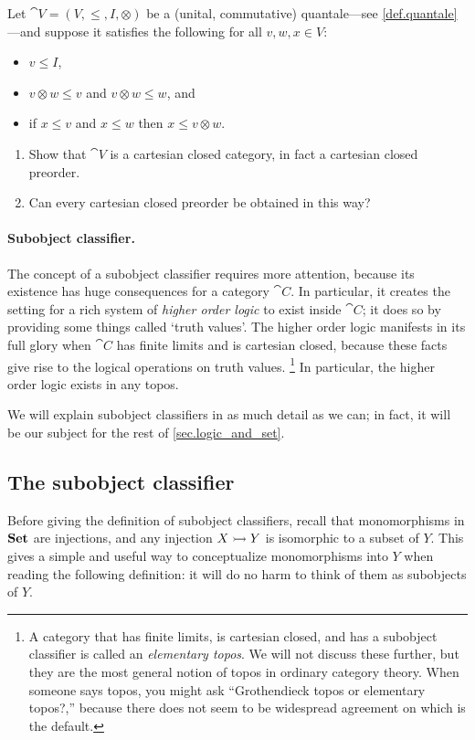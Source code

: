 \documentclass[7Sketches]{subfiles}
\begin{document}
\begin{exercise}%
\label{ex.ccposet_quantale}
Let $\cat{V}=(V,\leq,I,\otimes)$ be a (unital, commutative) quantale---see
\cref{def.quantale}---and suppose it satisfies the following for all $v,w,x\in V$:
\begin{itemize}
	\item $v\leq I$,
	\item $v\otimes w\leq v$ and $v\otimes w\leq w$, and
	\item if $x\leq v$ and $x\leq w$ then $x\leq v\otimes w$.\bigskip
\end{itemize}
\begin{enumerate}
	\item Show that $\cat{V}$ is a cartesian closed category, in fact a cartesian closed preorder.
	\item Can every cartesian closed preorder be obtained in this way?
\qedhere
\end{enumerate}
\end{exercise}

\paragraph{Subobject classifier.}%
The concept of a subobject classifier requires more attention, because its existence has huge consequences for a category $\cat{C}$. In particular, it creates the setting for a rich system of \emph{higher order logic} to exist inside $\cat{C}$; it does so by providing some things called `truth values'. The higher order logic manifests in its full glory when $\cat{C}$ has finite limits and is cartesian closed, because these facts give rise to the logical operations on truth values.%
\footnote{A category that has finite limits, is cartesian closed, and has a subobject classifier is called an \emph{elementary topos}. We will not discuss these further, but they are the most general notion of topos in ordinary category theory. When someone says topos, you might ask ``Grothendieck topos or elementary topos?,'' because there does not seem to be widespread agreement on which is the default.
}
In particular, the higher order logic exists in any topos.

We will explain subobject classifiers in as much detail as we can; in fact, it will be our subject for the rest of \cref{sec.logic_and_set}.

\subsection{The subobject classifier}%
\label{subsec.subobj_classifier}
Before giving the definition of subobject classifiers, recall that monomorphisms in $\mathbf{Set}$ are injections, and any injection $X\rightarrowtail Y$ is isomorphic to a subset of $Y$. This gives a simple and useful way to conceptualize monomorphisms into $Y$ when reading the following definition: it will do no harm to think of them as subobjects of $Y$.
\end{document}
